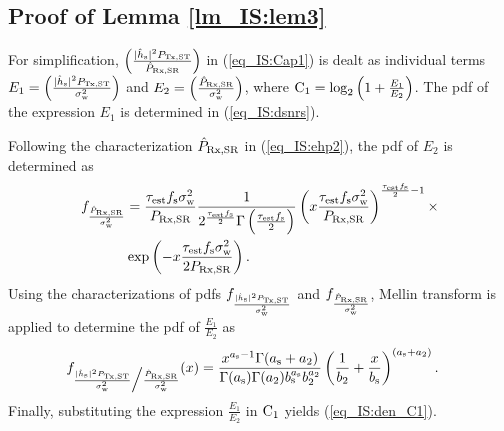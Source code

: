 {\subsection{Proof of Lemma \ref{lm_IS:lem3}} \label{ssec:lem3} 
\begin{IEEEproof}
For simplification, $\left( \frac{|\ehs|^2 \ptranst}{\eprcvdsr} \right)$ in (\ref{eq_IS:Cap1}) is dealt as individual terms $E_1 = \left( \frac{|\ehs|^2 \ptranst}{\npo} \right)$ and $E_2 = \left(\frac{\eprcvdsr}{\npo} \right)$, where $\co = \log_2 \left(1 + \frac{E_1}{E_2} \right)$. The pdf of the expression $E_1$ is determined in (\ref{eq_IS:dsnrs}).

Following the characterization $\eprcvdsr$ in (\ref{eq_IS:ehp2}), the pdf of $E_2$ is determined as 
\begin{align}
\dsnrp &= \frac{\Kp \npo}{\prcvdsr} \frac{1}{ 2^{\frac{\Kp}{2}} \Gamma\left(\frac{\Kp}{2}\right)} \left(x \frac{\Kp \npo}{ \prcvdsr} \right)^{\frac{\Kp}{2} - 1} \times \nonumber  \\ \quad & \exp \left(- x \frac{\Kp \npo}{2 \prcvdsr}  \right) \label{eq_IS:dsnrp}. 
\end{align}
Using the characterizations of pdfs $\dsnrs$ and $\dsnrp$, Mellin transform \cite{NIST} is applied to determine the pdf of $\frac{E_1}{E_2}$ as
\begin{align}
\dsnrsp(x) &= \frac{x^{\as - 1} \Gamma(\as + \ap)}{\Gamma(\as) \Gamma(\ap) \bs^{\as} \bp^{\ap}} \left(\frac{1}{\bp} + \frac{x}{\bs}\right)^{(\as + \ap)}. \label{eq_IS:dsnrsp} 
\end{align} 
Finally, substituting the expression $\frac{E_1}{E_2}$ in $\co$ yields (\ref{eq_IS:den_C1}).
\end{IEEEproof}



}
